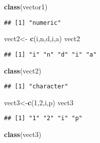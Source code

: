 \documentclass[
]{article}
\newenvironment{Shaded}{\begin{snugshade}}{\end{snugshade}}
\newcommand{\DecValTok}[1]{\textcolor[rgb]{0.00,0.00,0.81}{#1}}
\newcommand{\FunctionTok}[1]{\textcolor[rgb]{0.13,0.29,0.53}{\textbf{#1}}}
\newcommand{\NormalTok}[1]{#1}
\newcommand{\OtherTok}[1]{\textcolor[rgb]{0.56,0.35,0.01}{#1}}
\newcommand{\StringTok}[1]{\textcolor[rgb]{0.31,0.60,0.02}{#1}}
\begin{document}
\begin{Shaded}
\begin{Highlighting}[]
\FunctionTok{class}\NormalTok{(vector1)}
\end{Highlighting}
\end{Shaded}

\begin{verbatim}
## [1] "numeric"
\end{verbatim}

\begin{Shaded}
\begin{Highlighting}[]
\NormalTok{vect2}\OtherTok{\textless{}{-}} \FunctionTok{c}\NormalTok{(}\StringTok{\textquotesingle{}i\textquotesingle{}}\NormalTok{,}\StringTok{\textquotesingle{}n\textquotesingle{}}\NormalTok{,}\StringTok{\textquotesingle{}d\textquotesingle{}}\NormalTok{,}\StringTok{\textquotesingle{}i\textquotesingle{}}\NormalTok{,}\StringTok{\textquotesingle{}a\textquotesingle{}}\NormalTok{)}
\NormalTok{vect2}
\end{Highlighting}
\end{Shaded}

\begin{verbatim}
## [1] "i" "n" "d" "i" "a"
\end{verbatim}

\begin{Shaded}
\begin{Highlighting}[]
\FunctionTok{class}\NormalTok{(vect2)}
\end{Highlighting}
\end{Shaded}

\begin{verbatim}
## [1] "character"
\end{verbatim}

\begin{Shaded}
\begin{Highlighting}[]
\NormalTok{vect3}\OtherTok{\textless{}{-}}\FunctionTok{c}\NormalTok{(}\DecValTok{1}\NormalTok{,}\DecValTok{2}\NormalTok{,}\StringTok{\textquotesingle{}i\textquotesingle{}}\NormalTok{,}\StringTok{\textquotesingle{}p\textquotesingle{}}\NormalTok{)}
\NormalTok{vect3}
\end{Highlighting}
\end{Shaded}

\begin{verbatim}
## [1] "1" "2" "i" "p"
\end{verbatim}

\begin{Shaded}
\begin{Highlighting}[]
\FunctionTok{class}\NormalTok{(vect3)}
\end{Highlighting}
\end{Shaded}
\end{document}
